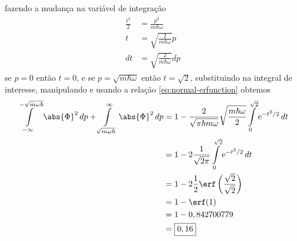 \begin{prob}
\begin{sol}
\begin{align}
				\end{align}
				fazendo a mudança na variável de integração
				\begin{align}
					\begin{split}
						\frac{t^{2}}{2} &= \frac{p^{2}}{m \hbar \omega}\\
						t &= \sqrt{\frac{2}{m \hbar \omega}}p\\
						dt &= \sqrt{\frac{2}{m \hbar \omega}} dp
					\end{split}
				\end{align}
				se $p=0$ então $t=0$, e se $p=\sqrt{m \hbar \omega}$ então $t=\sqrt{2}$, substituindo na integral de interesse, manipulando e usando a relação \eqref{eq:normal-erfunction} obtemos
				\begin{align}
					\begin{split}
						\int\limits_{-\infty}^{-\sqrt{m \omega \hbar}} \abs{\Phi}^{2}\,d{p}+\int\limits_{\sqrt{m \omega \hbar}}^{\infty}\abs{\Phi}^{2}\,d{p} &= 1 - \frac{2}{\sqrt{\pi \hbar m \omega}}\sqrt{\frac{m \hbar \omega}{2}}\int\limits_{0}^{\sqrt{2}}\mathrm{e}^{-t^{2}/2}\,d{t}\\
																																																																														 &= 1- 2\frac{1}{\sqrt{2 \pi}}\int\limits_{0}^{\sqrt{2}}\mathrm{e}^{-t^{2}/2}\,d{t}\\
																																																																														 &= 1-2\frac{1}{2}\erf \left(\frac{\sqrt{2}}{\sqrt{2}}\right)\\
																																																																														 &= 1-\erf(1)\\
																																																																														 &= 1-0,842700779\\
																																																																														 &= \boxed{0,16}
					\end{split}
				\end{align}
		 \end{sol}
	 \end{prob}

